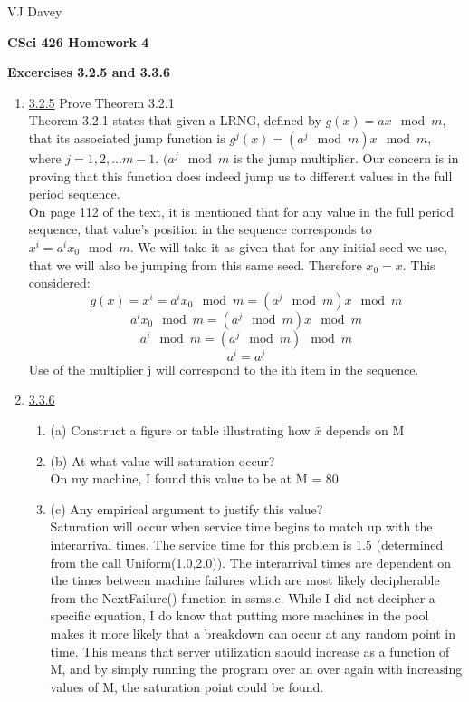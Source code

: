 \documentclass[11pt]{article}
\begin{document}
\centerline{VJ Davey}\vskip 0.10cm
\begin{LARGE}
\centerline {\bf CSci 426 Homework 4}
\end{LARGE}
\vskip 0.25cm
\centerline{\bf Excercises 3.2.5 and 3.3.6}
\begin{enumerate}
	\item \underline{3.2.5} Prove Theorem 3.2.1
	\\Theorem 3.2.1 states that given a LRNG, defined by $g(x) =ax\mod{m}$, that its associated jump function is $g^j(x) = (a^j\mod{m})x\mod{m}$, where $j=1,2,...m-1$. $(a^j\mod{m}$ is the jump multiplier. Our concern is in proving that this function does indeed jump us to different values in the full period sequence.
	\\On page 112 of the text, it is mentioned that for any value in the full period sequence, that value's position in the sequence corresponds to $x^i = a^ix_0\mod{m}$. We will take it as given that for any initial seed we use, that we will also be jumping from this same seed. Therefore $x_0 = x$. This considered:
	$$g(x) =x^i = a^ix_0\mod{m} =(a^j\mod{m})x\mod{m} $$
	$$a^ix_0\mod{m} =(a^j\mod{m})x\mod{m} $$
	$$a^i\mod{m} =(a^j\mod{m})\mod{m} $$
	$$a^i =a^j$$
	Use of the multiplier j will correspond to the ith item in the sequence.
	\item\underline{3.3.6}
	\begin{enumerate}
		\item (a) Construct a figure or table illustrating how $\bar{x}$ depends on M
		\vskip 7cm
		\item (b) At what value will saturation occur?
		\\On my machine, I found this value to be at M = 80
		\item (c) Any empirical argument to justify this value?
		\\Saturation will occur when service time begins to match up with the interarrival times. The service time for this problem is 1.5 (determined from the call Uniform(1.0,2.0)). The interarrival times are dependent on the times between machine failures which are most likely decipherable from the NextFailure() function in ssms.c. While I did not decipher a specific equation, I do know that putting more machines in the pool makes it more likely that a breakdown can occur at any random point in time. This means that server utilization should increase as a function of M, and by simply running the program over an over again with increasing values of M, the saturation point could be found.  
	\end{enumerate}
\end{enumerate}
\end{document}

